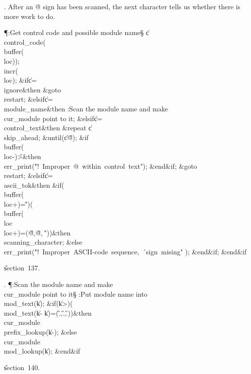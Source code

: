 . After an \.{@} sign has been scanned, the next character tells us
whether there is more work to do.

\Y\P\?\4:Get control code and possible module name\X\S\?\6
\|c\?\K\?\\{control\_code}\?\1(\?\\{buffer}\?\1(\?\\{loc}\?\2)\2)\?;\5
\\{incr}\?\1(\?\\{loc}\?\2)\?;\6
\&{if}\1\1\8\|c\?=\?\\{ignore}\2\8\&{then}\6
\&{goto}\8\\{restart};\6
\4\&{elsif}\1\8\|c\?=\?\\{module\_name}\2\8\&{then}\6
:Scan the module name and make \\{cur\_module} point to it\X;\6
\4\&{elsif}\1\8\|c\?=\?\\{control\_text}\2\8\&{then}\6
\1\&{repeat}\6
\|c\?\K\?\\{skip\_ahead};\2\6
\&{until}\?\8\1(\?\|c\?\I\?\H{@}\?\2)\?;\6
\&{if}\1\1\8\\{buffer}\?\1(\?\\{loc}\?-\?\2)\I\?\H{>}\2\8\&{then}\6
\\{err\_print}\?\1(\?\.{"!\ Improper\ @\ within\ control\ text"}\?\2)\?;\2\6
\&{end}\8\2\&{if}\1;\6
\&{goto}\8\\{restart};\6
\4\&{elsif}\1\8\|c\?=\?\\{ascii\_tok}\2\8\&{then}\6
\&{if}\1\1\?\8\1(\?\\{buffer}\?\1(\?\\{loc}\?+\?\2)=\?\H{\'}\?\2)\ORE\1(\?%
\\{buffer}\?\1(\?\\{loc}\?\to\?\\{loc}\?+\?\2)=\1(\?\H{@}\?,\?\H{@}\?,%
\?\H{\'}\?\2)\2)\?\2\8\&{then}\6
\\{scanning\_character}\?\K\?;\6
\4\&{else}\6
\\{err\_print}\?\1(\?\.{"!\ Improper\ ASCII-code\ sequence,\ \'\ sign\ mising"}%
\?\2)\?;\2\6
\&{end}\8\2\&{if}\1;\2\6
\&{end}\8\2\&{if}\1\par
\U section~137.\fi

. \P\?:Scan the module name and make \\{cur\_module} point to it\X\S%
\?\6
:Put module name into \\{mod\_text}\?(\?\to\?\|k\?)\?\X;\6
\&{if}\1\1\?\8\1(\?\|k\?>\?\2)\ANT\1(\?\\{mod\_text}\?\1(\?\|k\?-\?\to\?%
\|k\?\2)=\1(\?\H{.}\?,\?\H{.}\?,\?\H{.}\?\2)\2)\?\2\8\&{then}\6
\\{cur\_module}\?\K\?\\{prefix\_lookup}\?\1(\?\|k\?-\?\2)\?;\6
\4\&{else}\6
\\{cur\_module}\?\K\?\\{mod\_lookup}\?\1(\?\|k\?\2)\?;\2\6
\&{end}\8\2\&{if}\1\par
\U section~140.\fi

